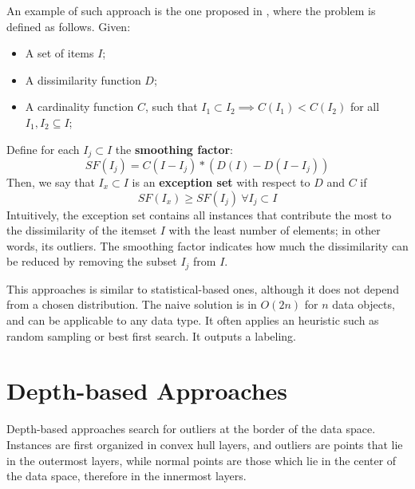 An example of such approach is the one proposed in \cite{arning1996linear}, where the problem is defined as follows. Given:
\begin{itemize}
    \item A set of items $I$;
    \item A dissimilarity function $D$;
    \item A cardinality function $C$, such that $I_1 \subset I_2 \implies C(I_1) < C(I_2)$ for all $I_1, I_2 \subseteq I$;
\end{itemize}
Define for each $I_j \subset I$ the \textbf{smoothing factor}:
\begin{equation*}
    SF(I_j) = C(I-I_j) * (D(I) - D(I-I_j))
\end{equation*}
Then, we say that $I_x \subset I$ is an \textbf{exception set} with respect to $D$ and $C$ if
\begin{equation*}
    SF(I_x) \geq SF(I_j) \ \forall I_j \subset I
\end{equation*}
Intuitively, the exception set contains all instances that contribute the most to the dissimilarity of the itemset $I$ with the least number of elements; in other words, its outliers. The smoothing factor indicates how much the dissimilarity can be reduced by removing the subset $I_j$ from $I$. 

This approaches is similar to statistical-based ones, although it does not depend from a chosen distribution. The naive solution is in $O(2n)$ for $n$ data objects, and can be applicable to any data type. It often applies an heuristic such as random sampling or best first search. It outputs a labeling.

\section{Depth-based Approaches}

Depth-based approaches search for outliers at the border of the data space. Instances are first organized in convex hull layers, and outliers are points that lie in the outermost layers, while normal points are those which lie in the center of the data space, therefore in the innermost layers.

